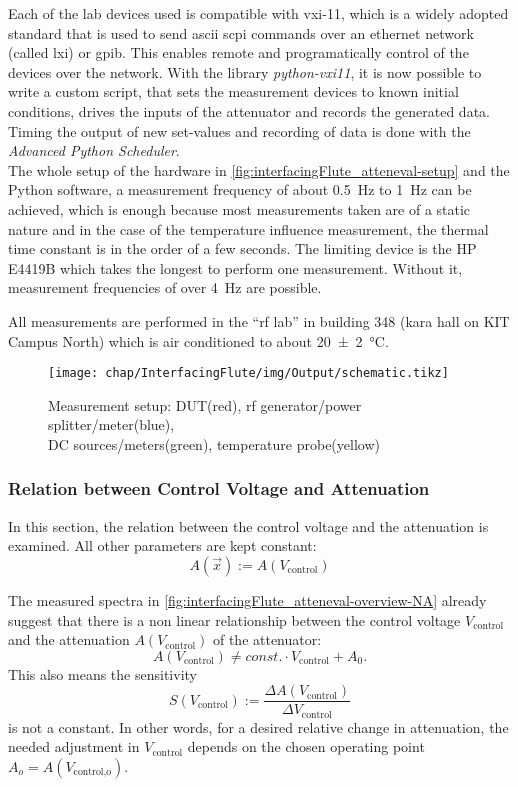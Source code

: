 Each of the lab devices used is compatible with \gls{vxi-11}, which is a widely adopted standard that is used to send \gls{ascii} \gls{scpi} commands over an ethernet network (called \gls{lxi}) or \gls{gpib}.\cite{lxi2021}
This enables remote and programatically control of the devices over the network.
With the library \textit{python-vxi11}, it is now possible to write a custom script, that sets the measurement devices to known initial conditions, drives the inputs of the attenuator and records the generated data. Timing the output of new set-values and recording of data is done with the \textit{Advanced Python Scheduler}.\cite{apscheduler}\\ 
The whole setup of the hardware in \autoref{fig:interfacingFlute_atteneval-setup} and the Python software, a measurement frequency of about \SI{0.5}{\Hz} to \SI{1}{\Hz} can be achieved, which is enough because most measurements taken are of a static nature and in the case of the temperature influence measurement, the thermal time constant is in the order of a few seconds.
The limiting device is the HP E4419B which takes the longest to perform one measurement. Without it, measurement frequencies of over \SI{4}{\Hz} are possible.

All measurements are performed in the ``\gls{rf} lab'' in building 348 (\gls{kara} hall on KIT Campus North) which is air conditioned to about \SI{20(2)}{\celsius}.

\begin{figure}[tb]
	\centering
	\texttt{[image: chap/InterfacingFlute/img/Output/schematic.tikz]}
	\caption[Measurement setup to evaluate the attenuator]{Measurement setup: DUT(red), \gls{rf} generator/power splitter/meter(blue),\\ DC sources/meters(green), temperature probe(yellow)}
	\label{fig:interfacingFlute_atteneval-setup}
\end{figure}

\subsubsection{Relation between Control Voltage and Attenuation}
In this section, the relation between the control voltage and the attenuation is examined. All other parameters are kept constant:
\begin{equation}
A(\vec{x}) := A(V_\text{control})
\end{equation}

The measured spectra in \autoref{fig:interfacingFlute_atteneval-overview-NA} already suggest that there is a non linear relationship between the control voltage $V_\text{control}$ and the attenuation $A(V_\text{control})$ of the attenuator:
\begin{equation}
A(V_\text{control}) \neq const. \cdot V_\text{control} + A_0.
\end{equation}
This also means the sensitivity
\begin{equation}
S(V_\text{control}) := \frac{\Delta A(V_\text{control})}{\Delta V_\text{control}}
\end{equation}
is not a constant.
In other words, for a desired relative change in attenuation, the needed adjustment in $V_\text{control}$ depends on the chosen operating point $A_o=A(V_\text{control,o})$.

